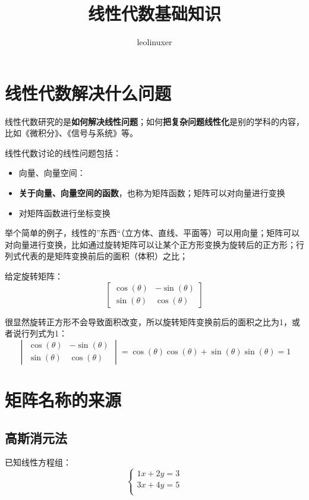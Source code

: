 \documentclass[12pt]{article}
\title{线性代数基础知识}
\author{leolinuxer}
\begin{document}
\maketitle

\section{线性代数解决什么问题\cite{Why_Learn_Linear_Algebra}}
线性代数研究的是\textbf{如何解决线性问题}；如何\textbf{把复杂问题线性化}是别的学科的内容，比如《微积分》、《信号与系统》等。

线性代数讨论的线性问题包括：
\begin{itemize}
    \item 向量、向量空间：
    \item \textbf{关于向量、向量空间的函数}，也称为矩阵函数；矩阵可以对向量进行变换
    \item 对矩阵函数进行坐标变换
\end{itemize}

举个简单的例子\cite{Cannot_Understand_Linear_Algebra}，线性的”东西“（立方体、直线、平面等）可以用向量；矩阵可以对向量进行变换，比如通过旋转矩阵可以让某个正方形变换为旋转后的正方形；行列式代表的是矩阵变换前后的面积（体积）之比；

给定旋转矩阵：
$$
\begin{bmatrix}
\cos(\theta) & -\sin(\theta) \\
\sin(\theta) &  \cos(\theta) 
\end{bmatrix}
$$

很显然旋转正方形不会导致面积改变，所以旋转矩阵变换前后的面积之比为1，或者说行列式为1：
$$
\begin{vmatrix}
\cos(\theta) & -\sin(\theta) \\
\sin(\theta) &  \cos(\theta) 
\end{vmatrix}
 = \cos(\theta)\cos(\theta) + \sin(\theta)\sin(\theta) = 1
 $$

\section{矩阵名称的来源}
\subsection{高斯消元法}
已知线性方程组：
$$
\begin{cases}
1x+2y=3\\
3x+4y=5\\
\end{cases}
$$
\end{document}
